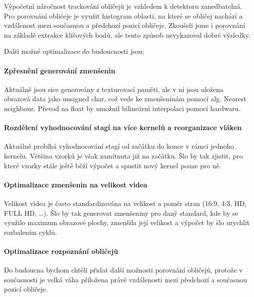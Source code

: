 \documentclass[12pt,a4paper,titlepage,final]{report}
\begin{document}
Výpočetní náročnost trackování obličejů je vzhledem k detektoru zanedbatelná. Pro porovnání obličeje je využit histogram oblasti, na které se obličej nachází a vzdálenost mezi současnou a předchozí pozicí obličeje. Zkoušeli jsme i porovnání na základě extrakce klíčových bodů, ale tento způsob nevykazoval dobré výsledky.

\vspace{0.5cm}
\noindent Další možné optimalizace do budoucnosti jsou:

\paragraph{Zpřesnění generování zmenšenin}
Aktuálně jsou sice generovány z texturovací paměti, ale v ní jsou uložena obrazová data jako unsigned char, což vede ke zmenšeninám pomocí alg. Nearest neighbour. Převod na float by umožnil bilineární interpolaci pomocí hardwaru.
	
\paragraph{Rozdělení vyhodnocování stagí na více kernelů a reorganizace vláken}
Aktuálně probíhá vyhodnocování stagí od začátku do konce v rámci jednoho kernelu. Většina vzorků je však zamítnuta již na začátku. Šlo by tak zjistit, pro které vzorky stále ještě běží výpočet a spustit nový kernel pouze pro ně.
	
\paragraph{Optimalizace zmenšenin na velikost videa} 
Velikost videa je často standardizována na velikost a poměr stran (16:9, 4:3, HD, FULL HD, …). Šlo by tak generovat zmenšeniny pro daný standard, kde by se využilo maximum obrazové plochy, zmenšila její velikost a výpočet by šlo urychlit rozbalením cyklů.

\paragraph{Optimalizace rozpoznání obličejů}
Do budoucna bychom chtěli přidat další možnosti porovnání obličejů, protože v současnosti je velká váha přiložena právě vzdálenosti mezi předchozí a současnou pozicí obličeje.





\nocite{cite1}
\nocite{cite2}
\nocite{cite3}
\nocite{cite4}


\hypertarget{bib}{}

\end{document}
